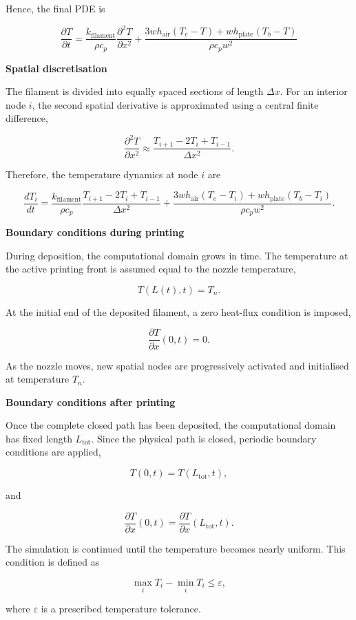 \documentclass[11pt,a4paper]{article}
\begin{document}
Hence, the final PDE is

\[
\frac{\partial T}{\partial t}
=
\frac{k_{\mathrm{filament}}}{\rho c_p}
\frac{\partial^2T}{\partial x^2}
+
\frac{
3wh_{\mathrm{air}}(T_e-T)
+
wh_{\mathrm{plate}}(T_b-T)
}{
\rho c_p w^2
}
\]

\medskip
\noindent\textbf{Spatial discretisation}

The filament is divided into equally spaced sections of length $\Delta x$. For an interior node
$i$, the second spatial derivative is approximated using a central finite difference,

\[
\frac{\partial^2T}{\partial x^2}
\approx
\frac{T_{i+1}-2T_i+T_{i-1}}{\Delta x^2}.
\]

Therefore, the temperature dynamics at node $i$ are

\[
\frac{dT_i}{dt}
=
\frac{k_{\mathrm{filament}}}{\rho c_p}
\frac{T_{i+1}-2T_i+T_{i-1}}{\Delta x^2}
+
\frac{
3wh_{\mathrm{air}}(T_e-T_i)
+
wh_{\mathrm{plate}}(T_b-T_i)
}{
\rho c_p w^2
}.
\]

\medskip
\noindent\textbf{Boundary conditions during printing}

During deposition, the computational domain grows in time. The temperature at the active
printing front is assumed equal to the nozzle temperature,

\[
T(L(t),t)=T_n.
\]

At the initial end of the deposited filament, a zero heat-flux condition is imposed,

\[
\frac{\partial T}{\partial x}(0,t)=0.
\]

As the nozzle moves, new spatial nodes are progressively activated and initialised at temperature
$T_n$.

\medskip
\noindent\textbf{Boundary conditions after printing}

Once the complete closed path has been deposited, the computational domain has fixed length
$L_{\mathrm{tot}}$. Since the physical path is closed, periodic boundary conditions are applied,

\[
T(0,t)=T(L_{\mathrm{tot}},t),
\]

and

\[
\frac{\partial T}{\partial x}(0,t)
=
\frac{\partial T}{\partial x}(L_{\mathrm{tot}},t).
\]

The simulation is continued until the temperature becomes nearly uniform. This condition is
defined as

\[
\max_i T_i-\min_i T_i\leq \varepsilon,
\]

where $\varepsilon$ is a prescribed temperature tolerance.
\end{document}
